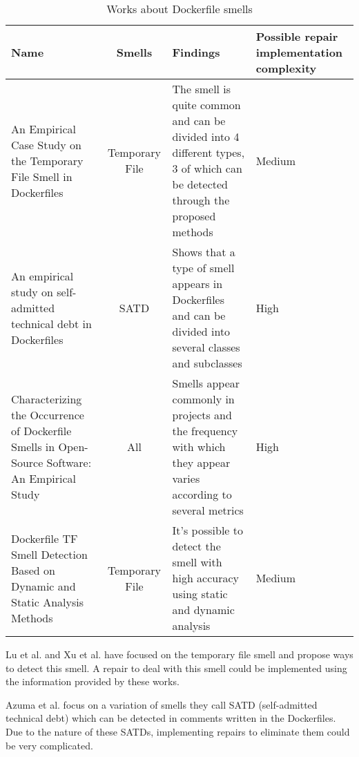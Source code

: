 \begin{table}[H]
    \centering
    \begin{tabular}{|p{}|c|p{}|p{}|}
        \hline \textbf{Name} & \textbf{Smells} & \textbf{Findings} & \textbf{Possible repair implementation complexity} \\
        \hline An Empirical Case Study on the Temporary File Smell in Dockerfiles \cite{luEmpiricalCaseStudy2019} & Temporary File & The smell is quite common and can be divided into 4 different types, 3 of which can be detected through the proposed methods & Medium \\
        \hline An empirical study on self-admitted technical debt in Dockerfiles \cite{azumaEmpiricalStudySelfadmitted2022} & SATD & Shows that a type of smell appears in Dockerfiles and can be divided into several classes and subclasses & High \\
        \hline Characterizing the Occurrence of Dockerfile Smells in Open-Source Software: An Empirical Study \cite{wuCharacterizingOccurrenceDockerfile2020} & All & Smells appear commonly in projects and the frequency with which they appear varies according to several metrics & High \\
        \hline Dockerfile TF Smell Detection Based on Dynamic and Static Analysis Methods \cite{xuDockerfileTFSmell2019} & Temporary File & It's possible to detect the smell with high accuracy using static and dynamic analysis & Medium \\
        \hline
    \end{tabular}
    \caption{Works about Dockerfile smells}
    \label{tab:works_dockerfile_smells}
\end{table}


Lu et al. \cite{luEmpiricalCaseStudy2019} and Xu et al. \cite{xuDockerfileTFSmell2019} have focused on the temporary file smell and propose ways to detect this smell. A repair to deal with this smell could be implemented using the information provided by these works.

Azuma et al. \cite{azumaEmpiricalStudySelfadmitted2022} focus on a variation of smells they call SATD (self-admitted technical debt) which can be detected in comments written in the Dockerfiles. Due to the nature of these SATDs, implementing repairs to eliminate them could be very complicated.


